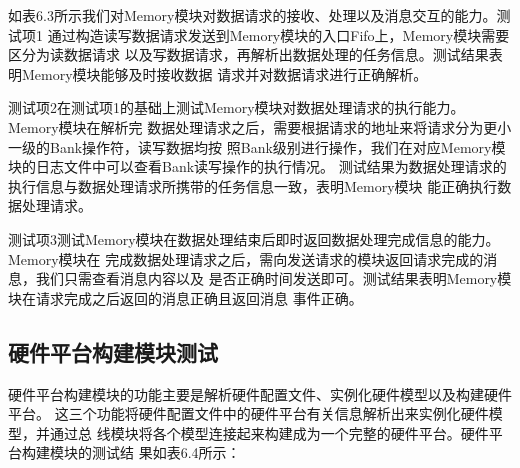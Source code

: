 如表6.3所示我们对Memory模块对数据请求的接收、处理以及消息交互的能力。测试项1
通过构造读写数据请求发送到Memory模块的入口Fifo上，Memory模块需要区分为读数据请求
以及写数据请求，再解析出数据处理的任务信息。测试结果表明Memory模块能够及时接收数据
请求并对数据请求进行正确解析。

测试项2在测试项1的基础上测试Memory模块对数据处理请求的执行能力。Memory模块在解析完
数据处理请求之后，需要根据请求的地址来将请求分为更小一级的Bank操作符，读写数据均按
照Bank级别进行操作，我们在对应Memory模块的日志文件中可以查看Bank读写操作的执行情况。
测试结果为数据处理请求的执行信息与数据处理请求所携带的任务信息一致，表明Memory模块
能正确执行数据处理请求。

测试项3测试Memory模块在数据处理结束后即时返回数据处理完成信息的能力。Memory模块在
完成数据处理请求之后，需向发送请求的模块返回请求完成的消息，我们只需查看消息内容以及
是否正确时间发送即可。测试结果表明Memory模块在请求完成之后返回的消息正确且返回消息
事件正确。

\subsection{硬件平台构建模块测试}

硬件平台构建模块的功能主要是解析硬件配置文件、实例化硬件模型以及构建硬件平台。
这三个功能将硬件配置文件中的硬件平台有关信息解析出来实例化硬件模型，并通过总
线模块将各个模型连接起来构建成为一个完整的硬件平台。硬件平台构建模块的测试结
果如表6.4所示：

